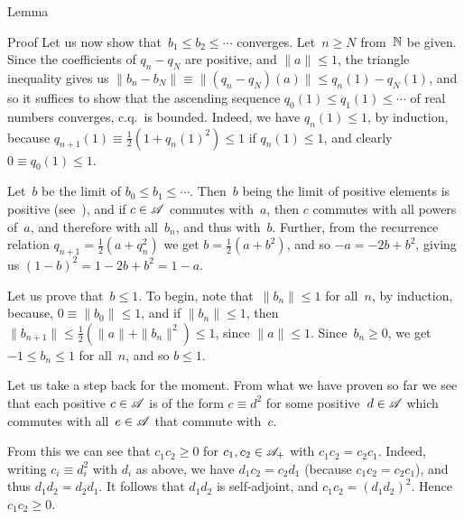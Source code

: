 \documentclass[a]{subfiles}
\begin{document}
\begin{parsec}
\begin{point}{Lemma}
\begin{point}{Proof}
Let us now show that~$b_1\leq b_2\leq \dotsb$ converges.
Let~$n\geq N$ from~$\mathbb{N}$ be given.
Since the coefficients of $q_n-q_N$ are positive,
and $\|a\|\leq 1$,
the triangle inequality gives us
$\|b_n-b_N\|\equiv \|(q_n-q_N)(a)\|\leq q_n(1)-q_N(1)$,
and
so it suffices to 
show that the ascending sequence
 $q_0(1)\leq q_1(1)\leq \dotsb$
of real numbers
converges,
c.q.~is bounded.
Indeed,
we have $q_n(1)\leq 1$,
by induction,
because $q_{n+1}(1)\equiv \frac{1}{2}(1+q_n(1)^2)
\leq 1$ if $q_n(1)\leq 1$,
and clearly $0\equiv q_0(1)\leq 1$.

Let~$b$ be the limit of $b_0\leq b_1\leq\dotsb$.
Then~$b$ being the limit of positive elements
is positive
(see~),
and if $c\in \mathscr{A}$ commutes with~$a$,
then $c$ commutes with all powers of~$a$,
and therefore with all~$b_n$,
and thus with~$b$.
Further, 
from the recurrence relation $q_{n+1} = \frac{1}{2}(a+q_n^2)$
we get $b=\frac{1}{2}(a+b^2)$,
and so $-a = -2b+b^2$, 
giving us  $(1-b)^2 = 1-2b+b^2 = 1-a$.

Let us prove that~$b\leq 1$.
To begin, note that~$\|b_n\|\leq 1$ for all~$n$, by induction,
because, $0\equiv \|b_0\|\leq 1$,
and if $\|b_n\|\leq 1$, then $\|b_{n+1}\|\leq \frac{1}{2}(\|a\|+\|b_n\|^2)
\leq 1$, since $\|a\|\leq 1$.
Since~$b_n\geq 0$, we get $-1\leq b_n\leq 1$ for all~$n$,
and so $b\leq 1$.

\begin{point}%
Let us take a step back for the moment.
From what we have proven so far
we see that each positive $c\in\mathscr{A}$
is of the form $c\equiv d^2$ for some positive~$d\in\mathscr{A}$
which commutes with all~$e\in \mathscr{A}$ that commute with~$c$.

From this we can see that $c_1c_2\geq 0$
for  
 $c_1,c_2 \in\mathscr{A}_{+}$
with $c_1c_2 = c_2c_1$.
Indeed, writing $c_i\equiv d_i^2$ with $d_i$ as above,
we have $d_1c_2=c_2d_1$ (because $c_1c_2=c_2c_1$), and thus 
$d_1d_2=d_2d_1$. It follows that $d_1d_2$ is self-adjoint,
and $c_1c_2 = (d_1d_2)^2$. Hence $c_1c_2\geq 0$.


\end{point}
\end{point}
\end{point}
\end{parsec}
\end{document}
